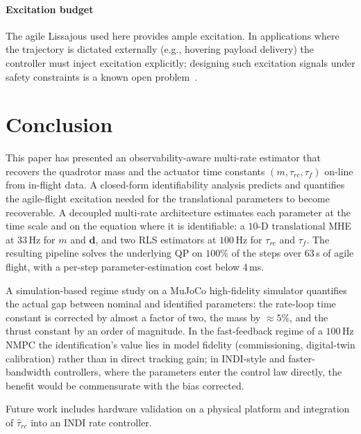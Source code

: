 \documentclass[lettersize,journal]{IEEEtran}
\newcommand{\vect}[1]{\bm{#1}}
\begin{document}
\paragraph*{Excitation budget}
The agile Lissajous used here provides ample excitation.  In
applications where the trajectory is dictated externally
(e.g., hovering payload delivery) the controller must inject
excitation explicitly; designing such excitation signals under
safety constraints is a known open
problem~\cite{wuest2019online}.

\section{Conclusion}\label{sec:conclusion}

This paper has presented an observability-aware multi-rate
estimator that recovers the quadrotor mass and the actuator
time constants $(m,\tau_{rc},\tau_f)$ on-line from in-flight
data.  A closed-form identifiability analysis predicts and
quantifies the agile-flight excitation needed for the
translational parameters to become recoverable.  A decoupled
multi-rate architecture estimates each parameter at the time
scale and on the equation where it is identifiable: a $10$-D
translational MHE at $33$\,Hz for $m$ and $\vect d$, and two
RLS estimators at $100$\,Hz for $\tau_{rc}$ and $\tau_f$.  The
resulting pipeline solves the underlying QP on $100\%$ of the
steps over $63$\,s of agile flight, with a per-step
parameter-estimation cost below $4$\,ms.

A simulation-based regime study on a MuJoCo high-fidelity
simulator quantifies the actual gap between nominal and
identified parameters: the rate-loop time constant is
corrected by almost a factor of two, the mass by $\approx 5\%$,
and the thrust constant by an order of magnitude.  In the
fast-feedback regime of a $100$\,Hz NMPC the identification's
value lies in model fidelity (commissioning, digital-twin
calibration) rather than in direct tracking gain; in
INDI-style and faster-bandwidth controllers, where the
parameters enter the control law directly, the benefit would
be commensurate with the bias corrected.

Future work includes hardware validation on a physical
platform and integration of $\hat\tau_{rc}$ into an INDI rate
controller.
\end{document}
